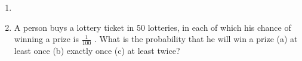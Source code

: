 \begin{enumerate}[label=\thechapter.\arabic*,ref=\thechapter.\theenumi]
\item
\item A person buys a lottery ticket in 50 lotteries, in each of which his chance of
winning a prize is $\frac{1}{100}$ . What is the probability that he will win a prize
(a) at least once (b) exactly once (c) at least twice?
\end{enumerate}
